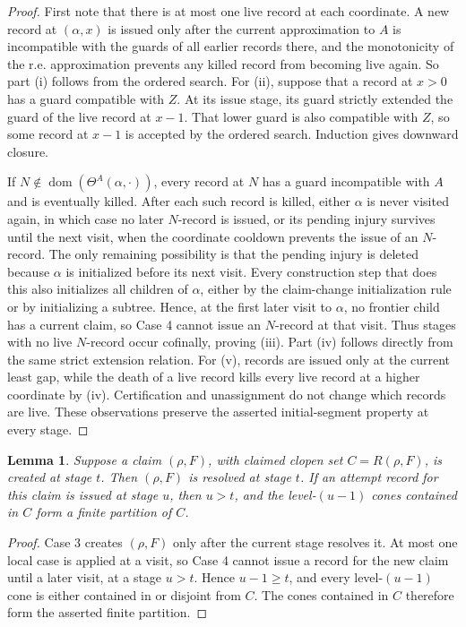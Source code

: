 \documentclass[11pt]{amsart}
\newtheorem{lemma}[theorem]{Lemma}
\begin{document}
\begin{proof}
First note that there is at most one live record at each coordinate. A new
record at $(\alpha,x)$ is issued only after the current approximation to $A$
is incompatible with the guards of all earlier records there, and the
monotonicity of the r.e. approximation prevents any killed record from
becoming live again.
So part (i) follows from the ordered search. For (ii), suppose that a record at
$x>0$ has a guard compatible with $Z$. At its issue stage, its guard strictly
extended the guard of the live record at $x-1$. That lower guard is also
compatible with $Z$, so some record at $x-1$ is accepted by the ordered
search. Induction gives downward closure.

If $N\notin\operatorname{dom}(\Theta^A(\alpha,\cdot))$, every record at $N$
has a guard incompatible with $A$ and is eventually killed. After each such
record is killed, either $\alpha$ is never visited again, in which case no
later $N$-record is issued, or its pending injury survives until the next
visit, when the coordinate cooldown prevents the issue of an $N$-record. The
only remaining possibility is that the pending injury is deleted because
$\alpha$ is initialized before its next visit. Every construction step that
does this also initializes all children of $\alpha$, either by the
claim-change initialization rule or by initializing a subtree. Hence, at the
first later visit to $\alpha$, no frontier child has a current claim, so Case
4 cannot issue an $N$-record at that visit. Thus stages with no live
$N$-record occur cofinally, proving (iii).
Part (iv) follows directly from the same strict extension relation. For (v),
records are issued only at the current least gap, while the death of a live
record kills every live record at a higher coordinate by (iv). Certification
and unassignment do not change which records are live. These observations
preserve the asserted initial-segment property at every stage.
\end{proof}

\begin{lemma}\label{low2:resolution}
Suppose a claim $(\rho,F)$, with claimed clopen set $C=R(\rho,F)$, is created
at stage $t$. Then $(\rho,F)$ is resolved at stage $t$. If an attempt record
for this claim is issued at stage $u$, then $u>t$, and the level-$(u-1)$ cones
contained in $C$ form a finite partition of $C$.
\end{lemma}

\begin{proof}
Case 3 creates $(\rho,F)$ only after the current stage resolves it. At most
one local case is applied at a visit, so Case 4 cannot issue a record for the
new claim until a later visit, at a stage $u>t$. Hence $u-1\geq t$, and every
level-$(u-1)$ cone is either contained in or disjoint from $C$. The cones
contained in $C$ therefore form the asserted finite partition.
\end{proof}
\end{document}
